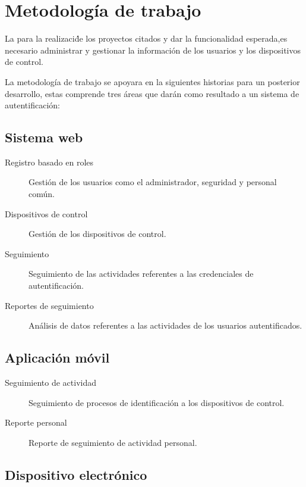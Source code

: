 \documentclass[11pt,twocolumn]{article}
\begin{document}
\section{Metodolog\'ia de trabajo}  

La para la realizaci\' de los proyectos citados y dar la funcionalidad 
esperada,es necesario  administrar y gestionar la informaci\'on de los usuarios y los 
dispositivos de control.

La metodolog\'ia de trabajo se apoyara en la siguientes historias para un posterior 
desarrollo, estas  comprende tres \'areas  que dar\'an como resultado a un 
sistema de autentificaci\'on:\\

	\subsection{ Sistema web }
	
	\begin{description}
		\item [Registro basado en roles] Gesti\'on de los usuarios como el 
		administrador, seguridad y personal com\'un.
		\item [Dispositivos de control] Gesti\'on de los dispositivos de control.
		\item [Seguimiento] Seguimiento de las actividades referentes a las 
		credenciales de autentificaci\'on.
		\item [Reportes de seguimiento] An\'alisis de datos referentes a las 
		actividades de los usuarios autentificados.
	\end{description}
	
	\subsection{Aplicaci\'on m\'ovil}		
	
	 \begin{description}
		 \item[Seguimiento de actividad] Seguimiento de procesos de identificaci\'on 
		 a los dispositivos de control.
		 \item[Reporte personal] Reporte de seguimiento de actividad personal.
	 \end{description}
	
	\subsection{Dispositivo electr\'onico}
	
\end{document}
